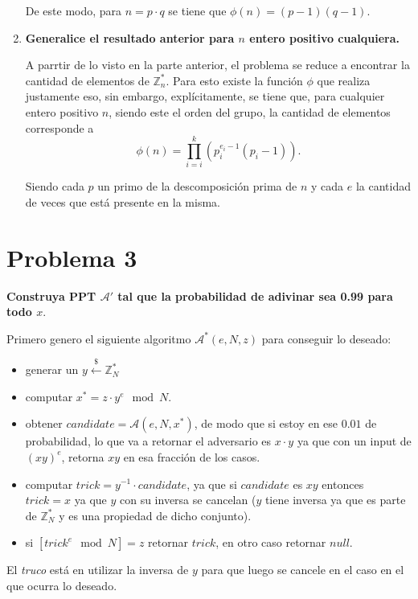 \documentclass[twoside]{tareas}
\newcommand{\getunif}{\stackrel{\$}{\gets}}
\begin{document}
\begin{enumerate}
    De este modo, para $n = p\cdot q$ se tiene que $\phi(n) = (p-1)(q-1).$


    \item \textbf{Generalice el resultado anterior para {\boldmath$n$} entero positivo cualquiera.}

    A parrtir de lo visto en la parte anterior, el problema se reduce a encontrar la cantidad de elementos de $\mathbb{Z}_n^*$. Para esto existe la función $\phi$ que realiza justamente eso, sin embargo, explícitamente, se tiene que, para cualquier entero positivo $n$, siendo este el orden del grupo, la cantidad de elementos corresponde a
    $$\phi(n) = \prod_{i=i}^{k}(p_i^{e_i-1} (p_i - 1)).$$

    Siendo cada $p$ un primo de la descomposición prima de $n$ y cada $e$ la cantidad de veces que está presente en la misma.

\end{enumerate}

\section*{Problema 3}

\textbf{Construya PPT {\boldmath$\mathcal{A}'$} tal que la probabilidad de adivinar sea 0.99 para todo {\boldmath$x$}}.

Primero genero el siguiente algoritmo $\mathcal{A}^*(e, N, z)$ para conseguir lo deseado:

\begin{itemize}
    \item generar un $y \getunif \mathbb{Z}_N^*$
    \item computar $x^* = z \cdot y^e \mod N$.
    \item obtener $candidate = \mathcal{A}(e, N, x^*)$, de modo que si estoy en ese $0.01$ de probabilidad, lo que va a retornar el adversario es $x\cdot y$ ya que con un input de $(xy)^e$, retorna $xy$ en esa fracción de los casos.
    \item computar $trick = y^{-1} \cdot candidate$, ya que si $candidate$ es $xy$ entonces $trick = x$ ya que $y$ con su inversa se cancelan ($y$ tiene inversa ya que es parte de $\mathbb{Z}_N^*$ y es una propiedad de dicho conjunto).
    \item si $[trick^e \mod N] = z$ retornar $trick$, en otro caso retornar $null$.
\end{itemize}

El \textit{truco} está en utilizar la inversa de $y$ para que luego se cancele en el caso en el que ocurra lo deseado.
\end{document}
